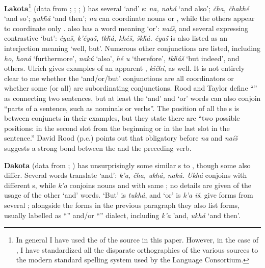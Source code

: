 \documentclass[output=paper]{LSP/langsci}
\begin{document}
\textbf{Lakota}\footnote{In general I have used the  of the source in this paper. However, in the case of , I have standardized all the disparate orthographies of the various sources to the modern standard spelling system used by the  Language Consortium.} (data from  \citealt{RoodTaylor1996}; \citealt{Ingham2003}; \citealt{Ullrich2016};  \citealt{BoasDeloria1941}) has several `and' s: \textit{na, nahá} `and also'; \textit{\v{c}ha, \v{c}hakhé} `and so'; \textit{yuk\v{h}á} `and then'; \textit{na} can coordinate nouns or , while the others appear to coordinate only .  also has a word meaning `or': \textit{naí\v{s}}, and several expressing contrastive  `but': \textit{éya\v{s}, k'éya\v{s}, tk\v{h}á, khé\v{s}, \v{s}k\v{h}á. éya\v{s}} is also listed as an interjection meaning `well, but'. Numerous other conjunctions are listed, including \textit{ho, honá} `furthermore', \textit{nakú} `also', \textit{hé u} `therefore', \textit{tk\v{h}á\v{s}} `but indeed', and others. Ulrich gives examples of an apparent , \textit{ki\v{c}hí}, as well. It is not entirely clear to me whether the `and/or/but' conjunctions are all coordinators or whether some (or all) are subordinating conjunctions. Rood and Taylor define ``'' as connecting two sentences, but at least the `and' and `or' words can also conjoin ``parts of a sentence, such as nominals or verbs''. The position of all the s is between conjuncts in their examples, but they state there are ``two possible positions: in the second slot from the beginning or in the last slot in the sentence.'' David Rood (p.c.) points out that obligatory  before \textit{na} and \textit{naí\v{s}} suggests a strong bond between the  and the preceding verb.

\textbf{Dakota} (data from \citealt{Riggs1851};  \citealt{BoasDeloria1941}) has unsurprisingly some similar s to , though some also differ. Several words translate `and': \textit{k'a, \v{c}ha, ukhá, nakú. Ukhá} conjoins  with different s, while \textit{k'a} conjoins nouns and  with same ; no details are given of the usage of the other `and' words. `But' is \textit{tukhá}, and `or' is \textit{k'a i\v{s}}. \citeauthor{BoasDeloria1941} give forms from several ; alongside the  forms in the previous paragraph they also list  forms, usually labelled as ``'' and/or ``'' dialect, including \textit{k'a} 'and, \textit{ukhá} `and then'.     
\end{document}
